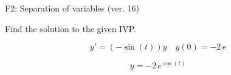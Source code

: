 \begin{exercise}
  \begin{exerciseTitle}F2: Separation of variables (ver. 16)\end{exerciseTitle}
  \begin{exerciseStatement}
    
Find the solution to the given IVP.

    
\[y'=( -\sin\left(t\right) )y\hspace{1em} y(0)= -2 \, e\]

  \end{exerciseStatement}
  \begin{exerciseAnswer}
    
\[y= -2 \, e^{\cos\left(t\right)}\]

  \end{exerciseAnswer}
\end{exercise}